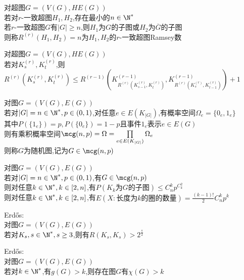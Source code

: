 \begin{dingyi}
对超图$G=(V(G),HE(G))$\\
若对$r$-一致超图$H_1,H_2$,存在最小的$n\in\N^*$\\
若$r$-一致超图$G$有$|G|\geq n$,则$H_1$为$G$的子图或$H_2$为$\overline{G}$的子图\\
则称$R^{(r)}(H_1,H_2)=n$为$H_1,H_2$的$r$-一致超图Ramsey数
\end{dingyi}

\begin{dingli}
对超图$G=(V(G),HE(G))$\\
若对$K_{s}^{(r)},K_{t}^{(r)}$,则$R^{(r)}(K_{s}^{(r)},K_{t}^{(r)})\leq R^{(r-1)}(K_{R^{(r)}(K_{s-1}^{(r)},K_{t}^{(r)})}^{(r-1)},K_{R^{(r)}(K_{s}^{(r)},K_{t-1}^{(r)})}^{(r-1)})+1$
\end{dingli}

\begin{dingyi}
对图$G=(V(G),E(G))$\\
若对$|G|=n\in\N^*, p\in(0,1)$,对任意$e\in E(K_{|G|})$,有概率空间$\Omega_{e}=\{0_{e},1_{e}\}$\\
其中$P(\{1_{e}\})=p, P(\{0_{e}\})=1-p$且事件$1_{e}$表示$e\in E(G)$\\
则有乘积概率空间$\mcg(n,p)=\Omega=\prod\limits_{e\in E(K_{|G|})}\Omega_{e}$\\
则称$G$为随机图,记为$G\in \mcg(n,p)$
\end{dingyi}

\begin{dingli}
对图$G=(V(G),E(G))$\\
若对$|G|=n\in\N^*, p\in(0,1)$,有$G\in\mcg(n,p)$\\
则对任意$k\in\N^*, k\in[2,n]$,有$P(K_{k}\text{为}G\text{的子图})\leq C_{n}^{k}p^{C_{k}^{2}}$\\
则对任意$k\in\N^*, k\in[2,n]$,有$E(X:\text{长度为}k\text{的圈的数量})=\frac{(k-1)!}{2}C_{n}^{k}p^{k}$
\end{dingli}

\begin{dingli}
Erd\H{o}s:\\
对图$G=(V(G),E(G))$\\
若对$K_{s}, s\in\N^*, s\geq 3$,则有$R(K_s,K_s)> 2^{\frac{s}{2}}$
\end{dingli}

\begin{dingli}
Erd\H{o}s:\\
对图$G=(V(G),E(G))$\\
若对$k\in\N^*$,有$g(G)>k$,则存在图$G$有$\chi(G)>k$
\end{dingli}

